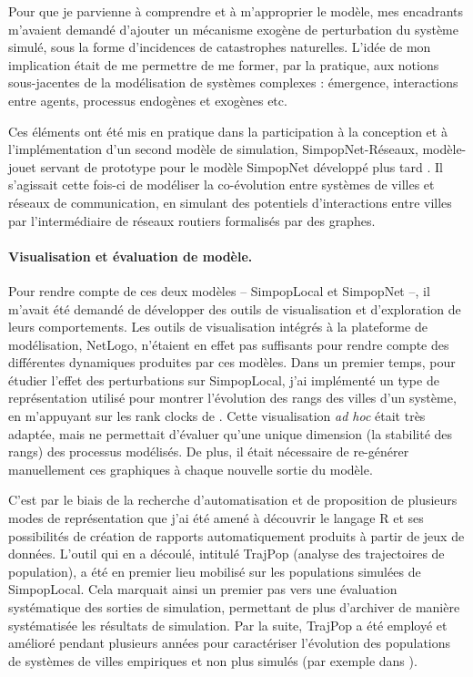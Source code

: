 Pour que je parvienne à comprendre et à m'approprier le modèle, mes encadrants m'avaient demandé d'ajouter un mécanisme exogène de perturbation du système simulé, sous la forme d'incidences de catastrophes naturelles. 
L'idée de mon implication était de me permettre de me former, par la pratique, aux notions sous-jacentes de la modélisation de systèmes complexes : émergence, interactions entre agents, processus endogènes et exogènes etc.

Ces éléments ont été mis en pratique dans la participation à la conception et à l'implémentation d'un second modèle de simulation, \og SimpopNet-Réseaux\fg{}, \og modèle-jouet\fg{} servant de prototype pour le modèle SimpopNet développé plus tard \autocite{schmitt_modelisation_2014}.
Il s'agissait cette fois-ci de modéliser la co-évolution entre systèmes de villes et réseaux de communication, en simulant des potentiels d'interactions entre villes par l'intermédiaire de réseaux routiers formalisés par des graphes.

\paragraph{Visualisation et évaluation de modèle.}
Pour rendre compte de ces deux modèles -- SimpopLocal et SimpopNet --, il m'avait été demandé de développer des outils de visualisation et d'exploration de leurs comportements.
Les outils de visualisation intégrés à la plateforme de modélisation, NetLogo, n'étaient en effet pas suffisants pour rendre compte des différentes dynamiques produites par ces modèles.
Dans un premier temps, pour étudier l'effet des perturbations sur SimpopLocal, j'ai implémenté un type de représentation utilisé pour montrer l'évolution des rangs des villes d'un système, en m'appuyant sur les \og rank clocks\fg{} de \textcite{batty_rank_2006}.
Cette visualisation \textit{ad hoc} était très adaptée, mais ne permettait d'évaluer qu'une unique dimension (la stabilité des rangs) des processus modélisés.
De plus, il était nécessaire de re-générer manuellement ces graphiques à chaque nouvelle sortie du modèle.

C'est par le biais de la recherche d'automatisation et de proposition de plusieurs modes de représentation que j'ai été amené à découvrir le langage R et ses possibilités de création de rapports automatiquement produits à partir de jeux de données.
L'outil qui en a découlé, intitulé TrajPop (analyse des trajectoires de population), a été en premier lieu mobilisé sur les populations simulées de SimpopLocal.
Cela marquait ainsi un premier pas vers une évaluation systématique des sorties de simulation, permettant de plus d'archiver de manière systématisée les résultats de simulation.
Par la suite, TrajPop a été employé et amélioré pendant plusieurs années pour caractériser l'évolution des populations de systèmes de villes empiriques et non plus simulés (par exemple dans \textcite{pumain_multilevel_2015}).

